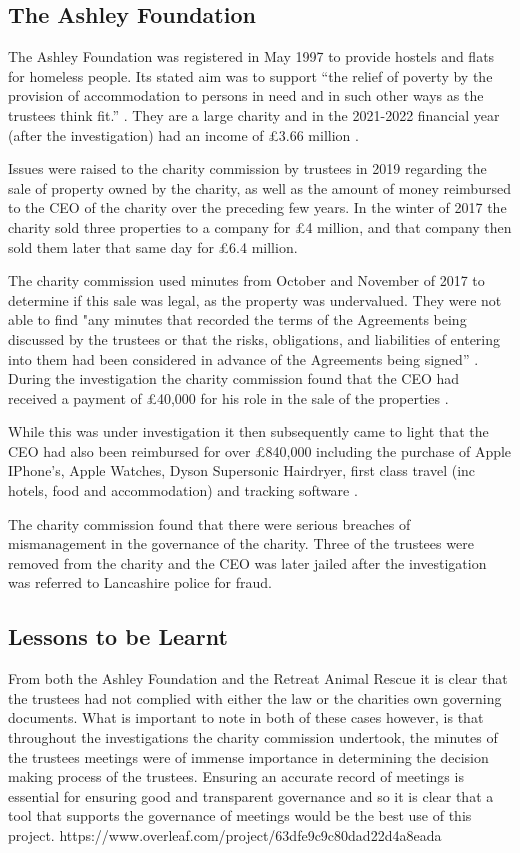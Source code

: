 \documentclass{UoYCSproject}
\begin{document}
\subsection{The Ashley Foundation}
The Ashley Foundation was registered in May 1997 to provide hostels and flats for homeless people. Its stated aim was to support “the relief of poverty by the provision of accommodation to persons in need and in such other ways as the trustees think fit.” \cite{ashley_foundation_report}. They are a large charity and in the 2021-2022 financial year (after the investigation) had an income of £3.66 million \cite{ashley_foundation_finance}. 

Issues were raised to the charity commission by trustees in 2019 regarding the sale of property owned by the charity, as well as the amount of money reimbursed to the CEO of the charity over the preceding few years. In the winter of 2017 the charity sold three properties to a company for £4 million, and that company then sold them later that same day for £6.4 million. 

The charity commission used minutes from October and November of 2017 to determine if this sale was legal, as the property was undervalued. They were not able to find "any minutes that recorded the terms of the Agreements being discussed by the trustees or that the risks, obligations, and liabilities of entering into them had been considered in advance of the Agreements being signed” \cite{ashley_foundation_report}. During the investigation the charity commission found that the CEO had received a payment of £40,000 for his role in the sale of the properties \cite{ashley_foundation_butler_2023}. 

While this was under investigation it then subsequently came to light that the CEO had also been reimbursed for over £840,000 including the purchase of Apple IPhone's, Apple Watches, Dyson Supersonic Hairdryer, first class travel (inc hotels, food and accommodation) and tracking software \cite{ashley_foundation_bbc}\cite{ashley_foundation_report}. 

The charity commission found that there were serious breaches of mismanagement in the governance of the charity. Three of the trustees were removed from the charity and the CEO was later jailed after the investigation was referred to Lancashire police for fraud\cite{ashley_foundation_report}.

\subsection{Lessons to be Learnt}
From both the Ashley Foundation and the Retreat Animal Rescue it is clear that the trustees had not complied with either the law or the charities own governing documents. What is important to note in both of these cases however, is that throughout the investigations the charity commission undertook, the minutes of the trustees meetings were of immense importance in determining the decision making process of the trustees. Ensuring an accurate record of meetings is essential for ensuring good and transparent governance and so it is clear that a tool that supports the governance of meetings would be the best use of this project.
https://www.overleaf.com/project/63dfe9c9c80dad22d4a8eada
\end{document}

